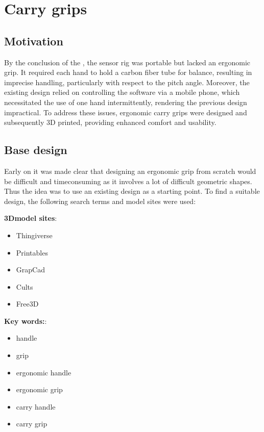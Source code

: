 \section{Carry grips}

\subsection{Motivation}
By the conclusion of the \preproject, the sensor rig was portable but lacked an ergonomic grip.
It required each hand to hold a carbon fiber tube for balance, resulting in imprecise handling, particularly with respect to the pitch angle.
Moreover, the existing design relied on controlling the software via a mobile phone, which necessitated the use of one hand intermittently, rendering the previous design impractical.
To address these issues, ergonomic carry grips were designed and subsequently 3D printed, providing enhanced comfort and usability.


\subsection{Base design}
Early on it was made clear that designing an ergonomic grip from scratch would be difficult and timeconsuming as it involves a lot of difficult geometric shapes.
Thus the idea was to use an existing design as a starting point.
To find a suitable design, the following search terms and model sites were used:

\begin{multicols}{2}
    \textbf{3Dmodel sites}:
    \begin{itemize}
        \item Thingiverse
        \item Printables
        \item GrapCad
        \item Cults
        \item Free3D
    \end{itemize}
    \columnbreak
    \textbf{Key words:}:
    \begin{itemize}
        \item handle
        \item grip
        \item ergonomic handle
        \item ergonomic grip
        \item carry handle
        \item carry grip
    \end{itemize}
\end{multicols}

